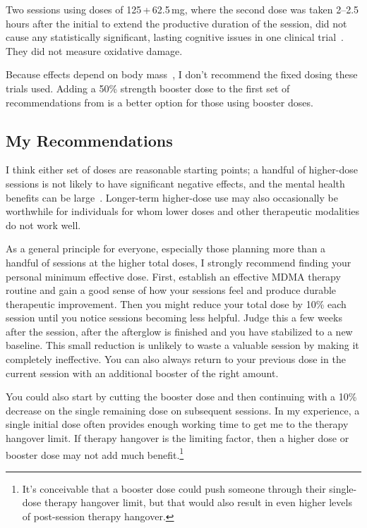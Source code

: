 \documentclass[11pt,oneside]{book}
\let\cite\parencite
\begin{document}
Two sessions using doses of 125\,+\,62.5\,mg, where the second dose was taken 2--2.5\,hours after the initial to extend the productive duration of the session, did not cause any statistically significant, lasting cognitive issues in one clinical trial~\cite{mithoeferSafety}. They did not measure oxidative damage.

Because effects depend on body mass~\cite{studerusResponse}, I don't recommend the fixed dosing these trials used. Adding a 50\% strength booster dose to the first set of recommendations from \textcite{liechtiInteractions} is a better option for those using booster doses.

\subsection*{My Recommendations}
I think either set of doses are reasonable starting points; a handful of higher-dose sessions is not likely to have significant negative effects, and the mental health benefits can be large~\cite{mitchellMDMAClinicalTrial2,mitchellMDMAClinicalTrial}. Longer-term higher-dose use may also occasionally be worthwhile for individuals for whom lower doses and other therapeutic modalities do not work well.

As a general principle for everyone, especially those planning more than a handful of sessions at the higher total doses, I strongly recommend finding your personal minimum effective dose. First, establish an effective MDMA therapy routine and gain a good sense of how your sessions feel and produce durable therapeutic improvement. Then you might reduce your total dose by 10\% each session until you notice sessions becoming less helpful. Judge this a few weeks after the session, after the afterglow is finished and you have stabilized to a new baseline. This small reduction is unlikely to waste a valuable session by making it completely ineffective. You can also always return to your previous dose in the current session with an additional booster of the right amount.

You could also start by cutting the booster dose and then continuing with a 10\% decrease on the single remaining dose on subsequent sessions. In my experience, a single initial dose often provides enough working time to get me to the therapy hangover limit. If therapy hangover is the limiting factor, then a higher dose or booster dose may not add much benefit.\footnote{It's conceivable that a booster dose could push someone through their single-dose therapy hangover limit, but that would also result in even higher levels of post-session therapy hangover.}
\end{document}
